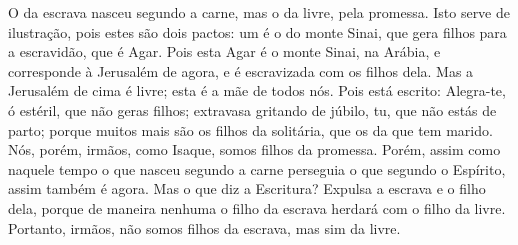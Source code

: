 {  O da escrava nasceu segundo a carne, mas o da livre, pela promessa.
  Isto serve de ilustração, pois estes são dois pactos: um é o do monte Sinai, que gera filhos para a escravidão, que é Agar.
  Pois esta Agar é o monte Sinai, na Arábia, e corresponde à Jerusalém de agora, e é escravizada com os filhos dela.
  Mas a Jerusalém de cima é livre; esta é a mãe de todos nós.
  Pois está escrito: Alegra-te, ó estéril, que não geras filhos; extravasa gritando de júbilo, tu, que não estás de parto; porque muitos mais são os filhos da solitária, que os da que tem marido.
{}
  Nós, porém, irmãos, como Isaque, somos filhos da promessa.
  Porém, assim como naquele tempo o que nasceu segundo a carne perseguia o que
{} segundo o Espírito, assim também é agora.
  Mas o que diz a Escritura? Expulsa a escrava e o filho dela, porque de maneira nenhuma o filho da escrava herdará com o filho da livre.
{}
  Portanto, irmãos, não somos filhos da escrava, mas sim da livre.
\par }

